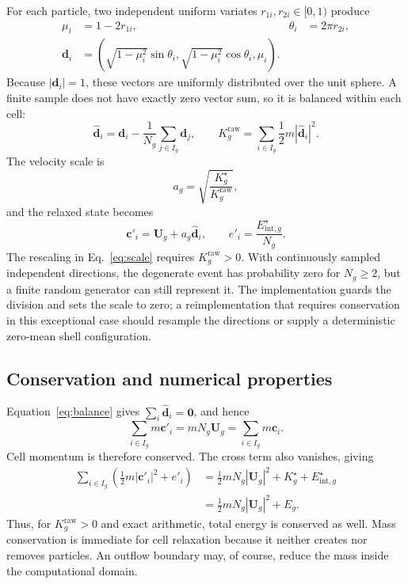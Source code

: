 \documentclass[a4paper,11pt]{article}
\newcommand{\vect}[1]{\bm{#1}}
\begin{document}
For each particle, two independent uniform variates
$r_{1i},r_{2i}\in[0,1)$ produce
\begin{align}
 \mu_i &= 1-2r_{1i}, & \theta_i&=2\pi r_{2i},\\
 \vect{d}_i &=
 \left(\sqrt{1-\mu_i^2}\sin\theta_i,
       \sqrt{1-\mu_i^2}\cos\theta_i,\mu_i\right).
 \label{eq:shell}
\end{align}
Because $|\vect{d}_i|=1$, these vectors are uniformly distributed over the
unit sphere.  A finite sample does not have exactly zero vector sum, so it is
balanced within each cell:
\begin{equation}
 \widehat{\vect{d}}_i=\vect{d}_i-
 \frac{1}{N_g}\sum_{j\in I_g}\vect{d}_j,
 \qquad
 K_g^{\mathrm{raw}}=\sum_{i\in I_g}\frac12m
 |\widehat{\vect{d}}_i|^2.
 \label{eq:balance}
\end{equation}
The velocity scale is
\begin{equation}
 a_g=\sqrt{\frac{K_g^{\star}}{K_g^{\mathrm{raw}}}},
 \label{eq:scale}
\end{equation}
and the relaxed state becomes
\begin{equation}
 \vect{c}'_i=\vect{U}_g+a_g\widehat{\vect{d}}_i,
 \qquad
 e'_i=\frac{E_{\mathrm{int},g}^{\star}}{N_g}.
 \label{eq:update}
\end{equation}
The rescaling in Eq.~\eqref{eq:scale} requires
$K_g^{\mathrm{raw}}>0$.  With continuously sampled independent directions,
the degenerate event has probability zero for $N_g\geq2$, but a finite random
generator can still represent it.  The implementation guards the division and
sets the scale to zero; a reimplementation that requires conservation in this
exceptional case should resample the directions or supply a deterministic
zero-mean shell configuration.

\subsection{Conservation and numerical properties}

Equation~\eqref{eq:balance} gives
$\sum_i\widehat{\vect{d}}_i=\vect{0}$, and hence
\begin{equation}
 \sum_{i\in I_g}m\vect{c}'_i=mN_g\vect{U}_g
 =\sum_{i\in I_g}m\vect{c}_i.
\end{equation}
Cell momentum is therefore conserved.  The cross term also vanishes, giving
\begin{align}
 \sum_{i\in I_g}\left(\frac12m|\vect{c}'_i|^2+e'_i\right)
 &=\frac12mN_g|\vect{U}_g|^2+K_g^{\star}
   +E_{\mathrm{int},g}^{\star}\\
 &=\frac12mN_g|\vect{U}_g|^2+E_g.
\end{align}
Thus, for $K_g^{\mathrm{raw}}>0$ and exact arithmetic, total energy is conserved
as well.  Mass conservation is immediate for cell relaxation because it neither
creates nor removes particles.  An outflow boundary may, of course, reduce the
mass inside the computational domain.
\end{document}
